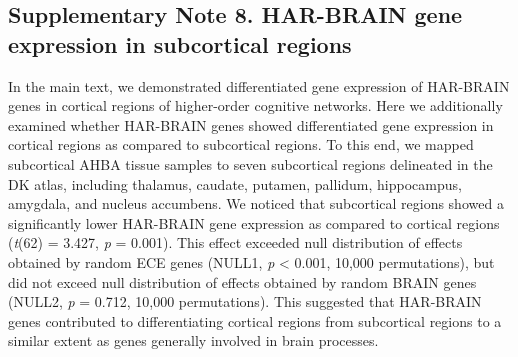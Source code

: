 \begin{refsection}
\subsection*{Supplementary Note 8. HAR-BRAIN gene expression in subcortical regions}
In the main text, we demonstrated differentiated gene expression of HAR-BRAIN genes in cortical regions of higher-order cognitive networks. Here we additionally examined whether HAR-BRAIN genes showed differentiated gene expression in cortical regions as compared to subcortical regions. To this end, we mapped subcortical AHBA tissue samples to seven subcortical regions delineated in the DK atlas, including thalamus, caudate, putamen, pallidum, hippocampus, amygdala, and nucleus accumbens. We noticed that subcortical regions showed a significantly lower HAR-BRAIN gene expression as compared to cortical regions (\textit{t}(62) = 3.427, \textit{p} = 0.001). This effect exceeded null distribution of effects obtained by random ECE genes (NULL1, \textit{p} < 0.001, 10,000 permutations), but did not exceed null distribution of effects obtained by random BRAIN genes (NULL2, \textit{p} = 0.712, 10,000 permutations). This suggested that HAR-BRAIN genes contributed to differentiating cortical regions from subcortical regions to a similar extent as genes generally involved in brain processes.


\end{refsection}
